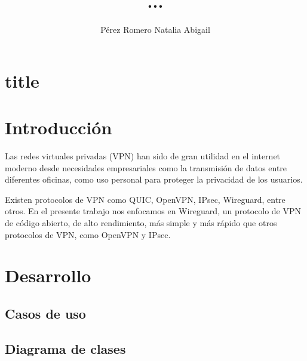 \documentclass[letterpaper,12pt,oneside]{book}
\author{Pérez Romero Natalia Abigail}
\title{ ...}
\begin{document}
\frontmatter
\maketitle


\mainmatter

\chapter{title}

\chapter{Introducción} %

Las redes virtuales privadas (VPN) han sido de gran utilidad en el internet moderno desde necesidades empresariales como la transmisión de datos entre diferentes oficinas, como uso personal para proteger la privacidad de los usuarios. 

Existen protocolos de VPN como QUIC, OpenVPN, IPsec, Wireguard, entre otros. 
En el presente trabajo nos enfocamos en Wireguard, un protocolo de VPN de código abierto, de alto rendimiento, más simple y más rápido que otros protocolos de VPN, como OpenVPN y IPsec.



%

\chapter{Desarrollo}

\section{Casos de uso}

\newpage


\newpage
\section{Diagrama de clases}





\end{document}
